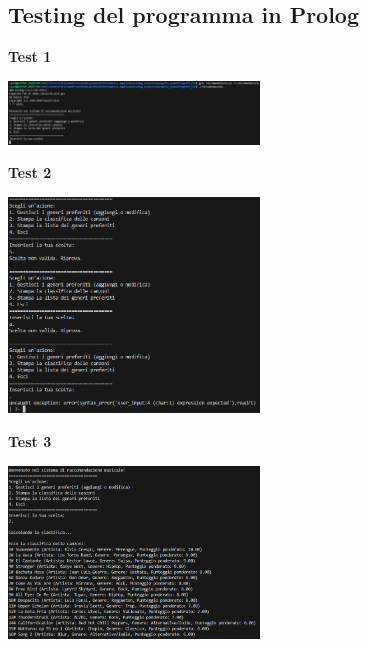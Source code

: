 \documentclass[a4paper,11pt]{article}
\begin{document}
\subsection{Testing del programma in Prolog}
\begin{center}
    \textbf{Test 1}
    \par
    \vspace{0.5cm}
    \includegraphics[width=0.5\textwidth]{ptest1}
\end{center}
\begin{center}
    \textbf{Test 2}
    \par
    \vspace{0.5cm}
    \includegraphics[width=0.5\textwidth]{ptest2}
\end{center}
\begin{center}
    \textbf{Test 3}
    \par
    \vspace{0.5cm}
    \includegraphics[width=0.5\textwidth]{ptest3}
\end{center}
\end{document}

